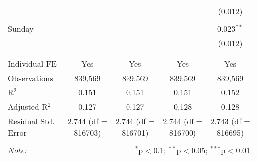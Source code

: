 \documentclass[
]{article}
\begin{document}
\begin{table}[!htbp]
{\begin{tabular}{@{\extracolsep{5pt}}lcccc}
  &  &  &  & (0.012) \\ 
  & & & & \\ 
 Sunday &  &  &  & 0.023$^{**}$ \\ 
  &  &  &  & (0.012) \\ 
  & & & & \\ 
\hline \\[-1.8ex] 
Individual FE & Yes & Yes & Yes & Yes \\ 
Observations & 839,569 & 839,569 & 839,569 & 839,569 \\ 
R$^{2}$ & 0.151 & 0.151 & 0.151 & 0.152 \\ 
Adjusted R$^{2}$ & 0.127 & 0.127 & 0.128 & 0.128 \\ 
Residual Std. Error & 2.744 (df = 816703) & 2.744 (df = 816701) & 2.744 (df = 816700) & 2.743 (df = 816695) \\ 
\hline 
\hline \\[-1.8ex] 
\textit{Note:}  & \multicolumn{4}{r}{$^{*}$p$<$0.1; $^{**}$p$<$0.05; $^{***}$p$<$0.01} \\ 
\end{tabular}
} 
\end{table} 
\newpage
\end{document}
